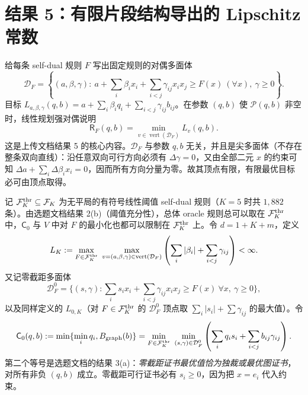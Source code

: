 \documentclass[11pt,a4paper]{ctexart}
\theoremstyle{definition}
\newcommand{\calP}{\mathcal P}
\newcommand{\calF}{\mathcal F}
\newcommand{\Rsk}{\mathsf R}
\newcommand{\CGraph}{\mathsf C_0}
\begin{document}
\section{结果 5：有限片段结构导出的 Lipschitz 常数}
给每条 self-dual 规则 $F$ 写出固定规则的对偶多面体
\begin{equation}\label{eq:dual}
\mathcal D_F=\left\{(a,\beta,\gamma):\ a+\sum_i\beta_i x_i+\sum_{i<j}\gamma_{ij}x_ix_j\ge F(x)\ (\forall x),\ \gamma\ge0\right\}.
\end{equation}
目标 $L_{a,\beta,\gamma}(q,b)=a+\sum_i\beta_iq_i+\sum_{i<j}\gamma_{ij}b_{ij}$。在参数 $(q,b)$ 使 $\calP(q,b)$ 非空时，线性规划强对偶说明
\begin{equation}\label{eq:vertexF}
\Rsk_F(q,b)=\min_{v\in\operatorname{vert}(\mathcal D_F)}L_v(q,b).
\end{equation}
这是上传文档结果 5 的核心内容。$\mathcal D_F$ 与参数 $q,b$ 无关，并且是尖多面体（不存在整条双向直线）：沿任意双向可行方向必须有 $\Delta\gamma=0$，又由全部二元 $x$ 的约束可知 $\Delta a+\sum_i\Delta\beta_i x_i=0$，因而所有方向分量为零。故其顶点有限，有限最优目标必可由顶点取得。

记 $\calF_K^{\rm thr}\subseteq\calF_K$ 为无平局的有符号线性阈值 self-dual 规则（$K=5$ 时共 $1{,}882$ 条）。由选题文档结果 2(b)（阈值充分性），总体 oracle 规则总可以取在 $\calF_K^{\rm thr}$ 中，$\CGraph$ 与 $V$ 中对 $F$ 的最小化也都可以限制在 $\calF_K^{\rm thr}$ 上。令 $d=1+K+m$，定义
\begin{equation}\label{eq:LK}
L_K:=\max_{F\in\calF_K^{\rm thr}}\ \max_{v=(a,\beta,\gamma)\in\operatorname{vert}(\mathcal D_F)}\left(\sum_i|\beta_i|+\sum_{i<j}\gamma_{ij}\right)<\infty.
\end{equation}
又记零截距多面体
\[
\mathcal D_F^0=\{(s,\gamma):\sum_is_ix_i+\sum_{i<j}\gamma_{ij}x_ix_j\ge F(x)\ \forall x,\ \gamma\ge0\},
\]
以及同样定义的 $L_{0,K}$（对 $F\in\calF_K^{\rm thr}$ 的 $\mathcal D_F^0$ 顶点取 $\sum_i|s_i|+\sum\gamma_{ij}$ 的最大值）。令
\begin{equation}\label{eq:C0}
\CGraph(q,b):=\min\{\min_iq_i,B_{\rm graph}(b)\}
=\min_{F\in\calF_K^{\rm thr}}\ \min_{(s,\gamma)\in\mathcal D_F^0}\left(\sum_iq_is_i+\sum_{i<j}b_{ij}\gamma_{ij}\right).
\end{equation}
第二个等号是选题文档的结果 3(a)：\emph{零截距证书最优值恰为独裁或最优图证书}，对所有非负 $(q,b)$ 成立。零截距可行证书必有 $s_i\ge0$，因为把 $x=e_i$ 代入约束。
\end{document}
